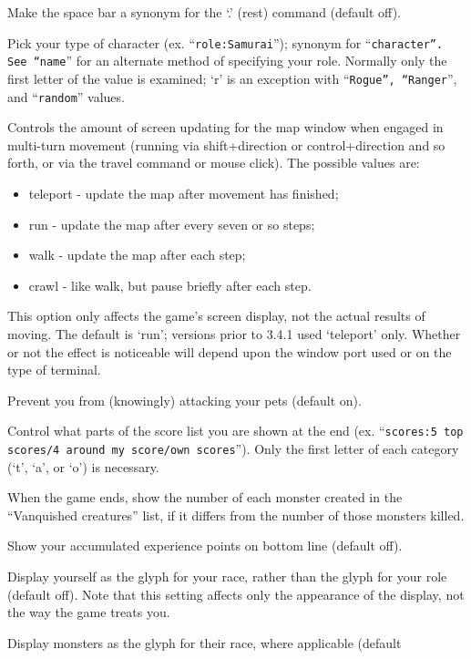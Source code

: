 Make the space bar a synonym for the `.' (rest) command (default off).
\item[\tb{``role    ''}]
Pick your type of character (ex. ``{\tt role:Samurai}'');
synonym for ``{\tt character''.  See ``name}'' for an alternate method
of specifying your role.  Normally only the first letter of the
value is examined; `r' is an exception with ``{\tt Rogue'', ``Ranger}'',
and ``{\tt random}'' values.
\item[\tb{runmode}]
Controls the amount of screen updating for the map window when engaged
in multi-turn movement (running via shift+direction or control+direction
and so forth, or via the travel command or mouse click).
The possible values are:
\begin{itemize}
\item teleport - update the map after movement has finished;
\item run - update the map after every seven or so steps;
\item walk - update the map after each step;
\item crawl - like walk, but pause briefly after each step.
\end{itemize}
This option only affects the game's screen display, not the actual
results of moving.  The default is `run'; versions prior to 3.4.1 
used `teleport' only.  Whether or not the effect is noticeable will
depend upon the window port used or on the type of terminal.
\item[\tb{safe\_pet}]
Prevent you from (knowingly) attacking your pets (default on).
\item[\tb{scores}]
Control what parts of the score list you are shown at the end (ex.
``{\tt scores:5 top scores/4 around my score/own scores}'').  Only the first
letter of each category (`t', `a', or `o') is necessary.
\item[\ib{showborn}]
When the game ends, show the number of each monster created
in the ``Vanquished creatures'' list, if it differs from the
number of those monsters killed.
\item[\tb{showexp}]
Show your accumulated experience points on bottom line (default off).
\item[\tb{showrace}]
Display yourself as the glyph for your race, rather than the glyph
for your role (default off).  Note that this setting affects only the
appearance of the display, not the way the game treats you.
\item[\tb{showmonrace}]
Display monsters as the glyph for their race, where applicable (default
